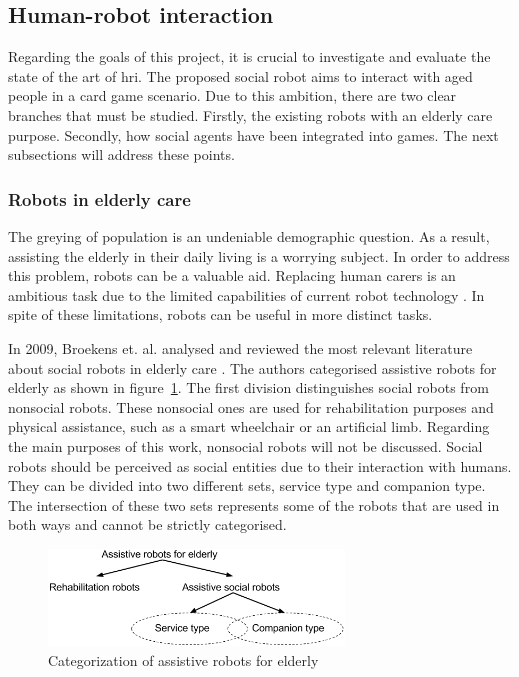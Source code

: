 \subsection{Human-robot interaction}

Regarding the goals of this project, it is crucial to investigate and evaluate the state of the art of \gls{hri}.
The proposed social robot aims to interact with aged people in a card game scenario.
Due to this ambition, there are two clear branches that must be studied.
Firstly, the existing robots with an elderly care purpose.
Secondly, how social agents have been integrated into games.
The next subsections will address these points.



\subsubsection{Robots in elderly care}


The greying of population is an undeniable demographic question.
As a result, assisting the elderly in their daily living is a worrying subject.
In order to address this problem, robots can be a valuable aid.
Replacing human carers is an ambitious task due to the limited capabilities of current robot technology \cite{Walters2013}.
In spite of these limitations, robots can be useful in more distinct tasks.

In 2009, Broekens et. al. analysed and reviewed the most relevant literature about social robots in elderly care \cite{Broekens2009}.
The authors categorised assistive robots for elderly as shown in figure~\ref{fig:categorization}.
The first division distinguishes social robots from nonsocial robots.
These nonsocial ones are used for rehabilitation purposes and physical assistance, such as a smart wheelchair or an artificial limb.
Regarding the main purposes of this work, nonsocial robots will not be discussed.
Social robots should be perceived as social entities due to their interaction with humans.
They can be divided into two different sets, service type and companion type.
The intersection of these two sets represents some of the robots that are used in both ways and cannot be strictly categorised.

\begin{figure}[h!]
  \centering
    \includegraphics[width=0.7\textwidth]{./img/categorization_robots}
  \caption{Categorization of assistive robots for elderly}
\label{fig:categorization}
\end{figure}

